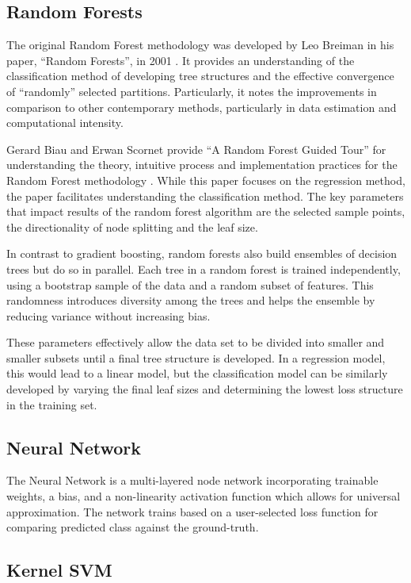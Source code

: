 \documentclass[10pt,twocolumn,letterpaper]{article}
\begin{document}
\subsection{Random Forests}

The original Random Forest methodology was developed by Leo Breiman in his paper, “Random Forests”, in 2001 \cite{randomforest}.
It provides an understanding of the classification method of developing tree structures and the effective convergence of “randomly” selected partitions.
Particularly, it notes the improvements in comparison to other contemporary methods, particularly in data estimation and computational intensity.

Gerard Biau and Erwan Scornet provide “A Random Forest Guided Tour” for understanding the theory, intuitive process and implementation practices for the Random Forest methodology \cite{randomforesttour}.
While this paper focuses on the regression method, the paper facilitates understanding the classification method.
The key parameters that impact results of the random forest algorithm are the selected sample points, the directionality of node splitting and the leaf size.

In contrast to gradient boosting, random forests also build ensembles of decision trees but do so in parallel.
Each tree in a random forest is trained independently, using a bootstrap sample of the data and a random subset of features.
This randomness introduces diversity among the trees and helps the ensemble by reducing variance without increasing bias.

These parameters effectively allow the data set to be divided into smaller and smaller subsets until a final tree structure is developed.
In a regression model, this would lead to a linear model, but the classification model can be similarly developed by varying the final leaf sizes and determining the lowest loss structure in the training set.

\subsection{Neural Network}

The Neural Network is a multi-layered node network incorporating trainable weights, a bias, and a non-linearity activation function which allows for universal approximation.
The network trains based on a user-selected loss function for comparing predicted class against the ground-truth.

\subsection{Kernel SVM}
\end{document}

